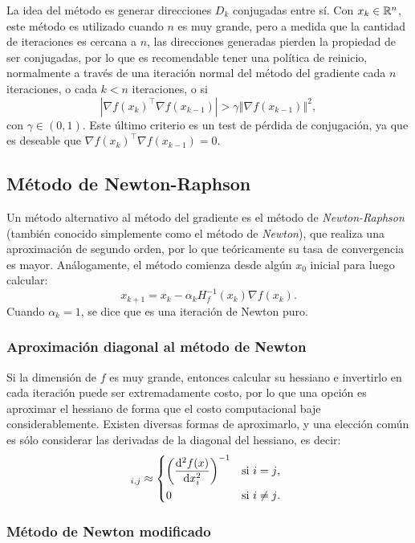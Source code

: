La idea del método es generar direcciones \(D_k\) conjugadas entre sí. Con \(x_k \in \mathbb{R}^n\), este método es utilizado cuando \(n\) es muy grande, pero a medida que la cantidad de iteraciones es cercana a \(n\), las direcciones generadas pierden la propiedad de ser conjugadas, por lo que es recomendable tener una política de reinicio, normalmente a través de una iteración normal del método del gradiente cada \(n\) iteraciones, o cada \(k < n\) iteraciones, o si
\[\left \vert \nabla f(x_k)^{\top} \nabla f(x_{k-1}) \right\vert > \gamma \left\Vert \nabla f(x_{k-1}) \right\Vert^2,\]
con \(\gamma \in (0,1)\). Este último criterio es un test de pérdida de conjugación, ya que es deseable que \(\nabla f(x_k)^{\top} \nabla f(x_{k-1}) = 0\).

\subsection{Método de Newton-Raphson}

Un método alternativo al método del gradiente es el método de \emph{Newton-Raphson} (también conocido simplemente como el método de \emph{Newton}), que realiza una aproximación de segundo orden, por lo que teóricamente su tasa de convergencia es mayor. Análogamente, el método comienza desde algún \(x_0\) inicial para luego calcular:
\[x_{k+1} = x_k - \alpha_k H_f^{-1} (x_k) \nabla f(x_k).\]
Cuando \(\alpha_k = 1\), se dice que es una iteración de Newton puro.

\subsubsection{Aproximación diagonal al método de Newton}

Si la dimensión de \(f\) es muy grande, entonces calcular su hessiano e invertirlo en cada iteración puede ser extremadamente costo, por lo que una opción es aproximar el hessiano de forma que el costo computacional baje considerablemente. Existen diversas formas de aproximarlo, y una elección común es sólo considerar las derivadas de la diagonal del hessiano, es decir:
\begin{equation*}
[H_f^{-1}(x_k)]_{i, j} \approx
\begin{dcases*}
\left(\dv[2]{f(x)}{x_i}\right)^{-1}	& si \(i = j\),\\
0									& si \(i\neq j\).
\end{dcases*}
\end{equation*}

\subsubsection{Método de Newton modificado}

